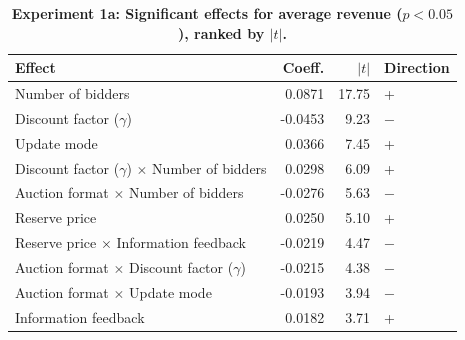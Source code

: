 \begin{table}[H]
\centering
\caption[Experiment 1a: Significant effects for average revenue ($p < 0.05$), ranked by $|t|$]{\textbf{Experiment 1a: Significant effects for average revenue ($p < 0.05$), ranked by $|t|$.}}
\label{tab:exp1a_ranked_rev}
\begin{tabular}{lrrl}
\toprule
\textbf{Effect} & \textbf{Coeff.} & \textbf{$|t|$} & \textbf{Direction} \\
\midrule
Number of bidders & 0.0871 & 17.75 & + \\
Discount factor ($\gamma$) & -0.0453 & 9.23 & $-$ \\
Update mode & 0.0366 & 7.45 & + \\
Discount factor ($\gamma$) $\times$ Number of bidders & 0.0298 & 6.09 & + \\
Auction format $\times$ Number of bidders & -0.0276 & 5.63 & $-$ \\
Reserve price & 0.0250 & 5.10 & + \\
Reserve price $\times$ Information feedback & -0.0219 & 4.47 & $-$ \\
Auction format $\times$ Discount factor ($\gamma$) & -0.0215 & 4.38 & $-$ \\
Auction format $\times$ Update mode & -0.0193 & 3.94 & $-$ \\
Information feedback & 0.0182 & 3.71 & + \\
\bottomrule
\end{tabular}
\end{table}
